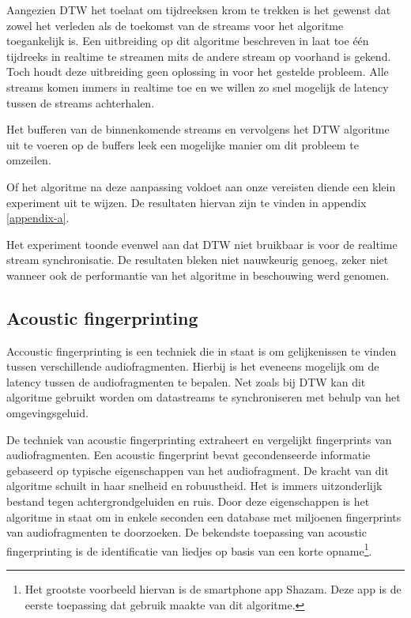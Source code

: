 Aangezien DTW het toelaat om tijdreeksen krom te trekken is het gewenst dat zowel het verleden als de toekomst van de streams voor het algoritme toegankelijk is. Een uitbreiding op dit algoritme beschreven in \cite{dixon2005live} laat toe één tijdreeks in realtime te streamen mits de andere stream op voorhand is gekend. Toch houdt deze uitbreiding geen oplossing in voor het gestelde probleem. Alle streams komen immers in realtime toe en we willen zo snel mogelijk de latency tussen de streams achterhalen.

Het bufferen van de binnenkomende streams en vervolgens het DTW algoritme uit te voeren op de buffers leek een mogelijke manier om dit probleem te omzeilen.

Of het algoritme na deze aanpassing voldoet aan onze vereisten diende een klein experiment uit te wijzen. De resultaten hiervan zijn te vinden in appendix \ref{appendix-a}.

Het experiment toonde evenwel aan dat DTW niet bruikbaar is voor de realtime stream synchronisatie. De resultaten bleken niet nauwkeurig genoeg, zeker niet wanneer ook de performantie van het algoritme in beschouwing werd genomen.

\subsection{Acoustic fingerprinting}

Accoustic fingerprinting is een techniek die in staat is om gelijkenissen te vinden tussen verschillende audiofragmenten. Hierbij is het eveneens mogelijk om de latency tussen de audiofragmenten te bepalen. Net zoals bij DTW kan dit algoritme gebruikt worden om datastreams te synchroniseren met behulp van het omgevingsgeluid.

De techniek van acoustic fingerprinting extraheert en vergelijkt fingerprints van audiofragmenten. Een acoustic fingerprint bevat gecondenseerde informatie gebaseerd op typische eigenschappen van het audiofragment. De kracht van dit algoritme schuilt in haar snelheid en robuustheid. Het is immers uitzonderlijk bestand tegen achtergrondgeluiden en ruis. Door deze eigenschappen is het algoritme in staat om in enkele seconden een database met miljoenen fingerprints van audiofragmenten te doorzoeken. De bekendste toepassing van acoustic fingerprinting is de identificatie van liedjes op basis van een korte opname\footnote{Het grootste voorbeeld hiervan is de smartphone app Shazam. Deze app is de eerste toepassing dat gebruik maakte van dit algoritme.}.


